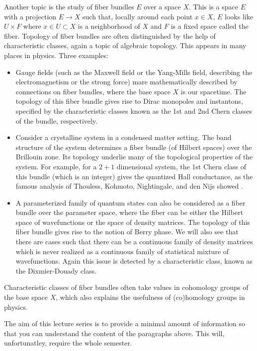 \documentclass[12pt]{article}
\numberwithin{equation}{section}
\begin{document}
Another topic is the study of fiber bundles $E$ over a space $X$.
This is a space $E$ with a projection $E\to X$ such that, locally around each point $x\in X$, 
$E$ looks like $U\times F$ where $x\in U\subset X$ is a neighborhood of $X$ and $F$ is a fixed space called the fiber.
Topology of fiber bundles are often distinguished by the help of characteristic classes,
again a topic of algebraic topology.
This appears in many places in physics. Three examples:
\begin{itemize}
\item Gauge fields (such as the Maxwell field or the Yang-Mills field, describing the electromagnetism or the strong force)
mare mathematically described by connections on fiber bundles, where the base space $X$ is our spacetime.
The topology of this fiber bundle gives rise to Dirac monopoles and instantons,
specified by the characteristic classes known as the 1st and 2nd Chern classes of the bundle, respectively.
\item Consider a crystalline system in a condensed matter setting. The band structure of the system
determines a fiber bundle (of Hilbert spaces) over the Brillouin zone. 
Its topology underlie many of the topological properties of the system.
For example, for a $2+1$ dimensional system, 
the 1st Chern class of this bundle (which is an integer) gives the quantized Hall conductance,
as the famous analysis of Thouless, Kohmoto, Nightingale, and den Nijs showed \cite{Thouless:1982zz}.
\item A parameterized family of quantum states can also be considered as a fiber bundle over the parameter space,
where the fiber can be either the Hilbert space of wavefunctions or the space of density matrices.
The topology of this fiber bundle gives rise to the notion of Berry phase.
We will also see that there are cases such that there can be a continuous family of density matrices
which is never realized as a continuous family of statistical mixture of wavefunctions.
Again this issue is detected by a characteristic class, known as the Dixmier-Douady class.
\end{itemize}
Characteristic classes of fiber bundles often take values in cohomology groups of the base space $X$,
which also explains the usefulness of (co)homology groups in physics.

The aim of this lecture series is to provide a minimal amount of information so that you can understand 
the content of the paragraphs above.
This will, unfortunatley, require the whole semester.
\end{document}
